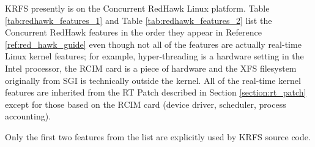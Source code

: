 \documentclass[12pt]{article}
\begin{document}
KRFS presently is on the Concurrent RedHawk Linux platform. Table
\ref{tab:redhawk_features_1} and Table \ref{tab:redhawk_features_2} list the
Concurrent RedHawk features in the order they appear in Reference
\ref{ref:red_hawk_guide} even though not all of the features are actually
real-time Linux kernel features; for example, hyper-threading is a hardware
setting in the Intel processor, the RCIM card is a piece of hardware and the XFS
filesystem originally from SGI is technically outside the kernel.  All of the
real-time kernel features are inherited from the RT Patch described in Section
\ref{section:rt_patch} except for those based on the RCIM card (device driver,
scheduler, process accounting).

Only the first two features from the list are explicitly used by KRFS source
code.
\end{document}
